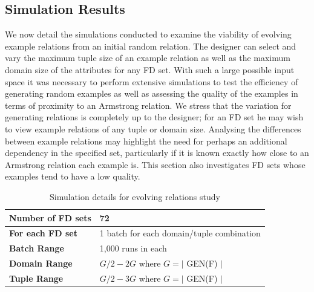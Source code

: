 \subsection{Simulation Results}


We now detail the simulations conducted to examine the
viability of evolving example relations from an initial
random relation. The designer can select and vary the maximum tuple size
of an example relation as well as the maximum domain size of the
attributes for any 
FD set. With such a large possible input space it was necessary to
 perform extensive simulations to test
the efficiency of generating random examples as well as assessing
the quality of the examples in terms of proximity to an Armstrong 
relation. We stress that the
variation for generating relations is completely up to the
designer; for an FD set he may wish to view example relations
of any tuple or domain size. Analysing the differences between example relations
 may highlight the need for perhaps
an additional dependency in the specified set, particularly if it
is known exactly how close to an Armstrong relation each example is. 
This section
also investigates FD sets whose examples tend to have a low
quality.

\medskip

{\line
\begin{table}[ht]
\begin{center}
\begin{tabular}{|l||l|}
\hline
{\bf Number of FD sets}  & 72 \\ \hline
{\bf For each FD set} & 1 batch for each domain/tuple combination\\ \hline
{\bf Batch Range} & 1,000 runs in each \\ \hline
{\bf Domain Range} & $G/2 - 2G$ where $ G = \mid$ GEN(F) $\mid$  \\ \hline
{\bf Tuple Range} & $G/2 - 3G$  where $ G = \mid$ GEN(F) $\mid$  \\ \hline 
\end{tabular}
\end{center}
\caption{\label{table:5.01} Simulation details for evolving relations study}
\end{table}
}


